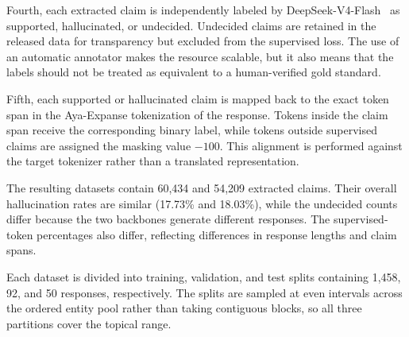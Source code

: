 \documentclass[conference]{IEEEtran}
\begin{document}
Fourth, each extracted claim is independently labeled by DeepSeek-V4-Flash~\cite{b15} as supported, hallucinated, or undecided. Undecided claims are retained in the released data for transparency but excluded from the supervised loss. The use of an automatic annotator makes the resource scalable, but it also means that the labels should not be treated as equivalent to a human-verified gold standard.

Fifth, each supported or hallucinated claim is mapped back to the exact token span in the Aya-Expanse tokenization of the response. Tokens inside the claim span receive the corresponding binary label, while tokens outside supervised claims are assigned the masking value $-100$. This alignment is performed against the target tokenizer rather than a translated representation.

\begin{table}[ht]
\centering
\small
\caption{Statistics of the two native Persian uncertainty datasets.}
\label{tab:data}
\end{table}

The resulting datasets contain 60,434 and 54,209 extracted claims. Their overall hallucination rates are similar (17.73\% and 18.03\%), while the undecided counts differ because the two backbones generate different responses. The supervised-token percentages also differ, reflecting differences in response lengths and claim spans.

Each dataset is divided into training, validation, and test splits containing 1,458, 92, and 50 responses, respectively. The splits are sampled at even intervals across the ordered entity pool rather than taking contiguous blocks, so all three partitions cover the topical range.
\end{document}
